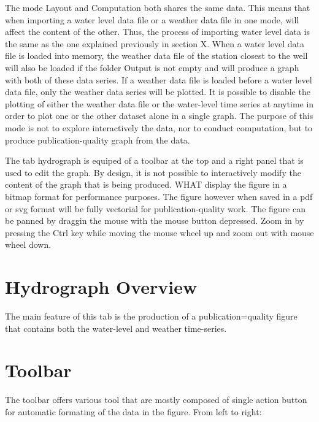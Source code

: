 \documentclass[WHATMANUAL.tex]{subfiles}
\begin{document}
The mode Layout and Computation both shares the same data. This means that when importing a water level data file or a weather data file in one mode, will affect the content of the other. Thus, the process of importing water level data is the same as the one explained previously in section X. When a water level data file is loaded into memory, the weather data file of the station closest to the well will also be loaded if the folder Output is not empty and will produce a graph with both of these data series. If a weather data file is loaded before a water level data file, only the weather data series will be plotted. It is possible to disable the plotting of either the weather data file or the water-level time series at anytime in order to plot one or the other dataset alone in a single graph. The purpose of this mode is not to explore interactively the data, nor to conduct computation, but to produce publication-quality graph from the data.

The tab hydrograph is equiped of a toolbar at the top and a right panel that is used to edit the graph. By design, it is not possible to interactively modify the content of the graph that is being produced. WHAT display the figure in a bitmap format for performance purposes. The figure however when saved in a pdf or svg format will be fully vectorial for publication-quality work. The figure can be panned by draggin the mouse with the mouse button depressed. Zoom in by pressing the Ctrl key while moving the mouse wheel up and zoom out with mouse wheel down.

\section{Hydrograph Overview}

The main feature of this tab is the production of a publication=quality figure that contains both the water-level and weather time-series.

\section{Toolbar}

The toolbar offers various tool that are mostly composed of single action button for automatic formating of the data in the figure. From left to right:\vspace{0.5cm}
\end{document}

